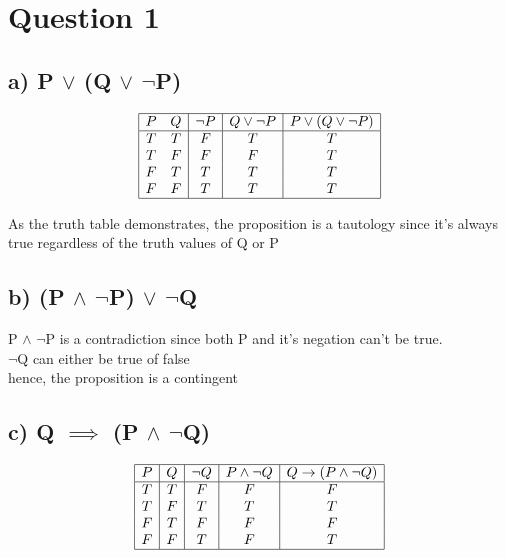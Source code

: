 \documentclass[a4paper]{article}
\begin{document}
\section*{Question 1}


\subsection*{a) P $\lor$ (Q $\lor$ $\neg$P)}

\begin{displaymath}
    \begin{array}{|c c| c | c | c |}
        \hline
        P & Q & \neg P & Q \lor \neg P & P \lor (Q \lor \neg P)\\
        \hline
        T & T & F & T & T\\
        T & F & F & F & T\\
        F & T & T & T & T\\
        F & F & T & T & T\\
        \hline
    \end{array}
\end{displaymath}

As the truth table demonstrates, the proposition is a tautology since
it's always true regardless of the truth values of Q or P


\subsection*{b) (P $\land$ $\neg$P) $\lor$ $\neg$Q}

P $\land$ $\neg$P is a contradiction since both P and it's negation can't be
true.\\
$\neg$Q can either be true of false\\
hence, the proposition is a contingent


\subsection*{c) Q $\implies$ (P $\land$ $\neg$Q)}

\begin{displaymath}
    \begin{array}{|c|c|c|c|c|}
        \hline
        P & Q & \neg Q & P \land \neg Q & Q \rightarrow (P \land \neg Q) \\
        \hline
        T & T & F & F & F \\
        T & F & T & T & T \\
        F & T & F & F & F \\
        F & F & T & F & T \\
        \hline
    \end{array}
\end{displaymath}
\end{document}
